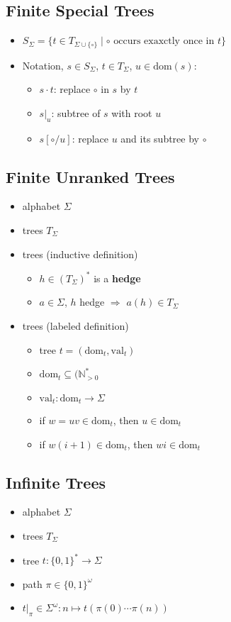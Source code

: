 \documentclass{article}
\begin{document}
\subsection{Finite Special Trees}
\begin{itemize}
	\item $S_\Sigma = \{ t \in T_{\Sigma \cup \{\circ\}} \mid \circ \text{ occurs exaxctly once in } t \}$
	\item Notation, $s \in S_\Sigma$, $t \in T_\Sigma$, $u \in \text{dom}(s)$:
	\begin{itemize}
		\item $s \cdot t$: replace $\circ$ in $s$ by $t$
		\item $s|_u$: subtree of $s$ with root $u$
		\item $s[\circ/u]$: replace $u$ and its subtree by $\circ$
	\end{itemize}
\end{itemize}

\subsection{Finite Unranked Trees}
\begin{itemize}
	\item alphabet $\Sigma$
	\item trees $T_\Sigma$
	\item trees (inductive definition) 
		\begin{itemize}
			\item $h \in (T_\Sigma)^*$ is a \textbf{hedge}
			\item $a \in \Sigma$, $h$ hedge $\Rightarrow$ $a(h) \in T_\Sigma$
		\end{itemize}
	\item trees (labeled definition) 
		\begin{itemize}
			\item tree $t = (\text{dom}_t, \text{val}_t)$
			\item $\text{dom}_t \subseteq (\mathbb{N}_{> 0}^*$
			\item $\text{val}_t : \text{dom}_t \rightarrow \Sigma$
			\item if $w = uv \in \text{dom}_t$, then $u \in \text{dom}_t$
			\item if $w(i+1) \in \text{dom}_t$, then $wi \in \text{dom}_t$
		\end{itemize}
\end{itemize}

\subsection{Infinite Trees}
\begin{itemize}
	\item alphabet $\Sigma$
	\item trees $T_\Sigma$
	\item tree $t : \{0, 1\}^* \rightarrow \Sigma$
	\item path $\pi \in \{0, 1\}^\omega$
	\item $t|_\pi \in \Sigma^\omega : n \mapsto t(\pi(0) \cdots \pi(n))$
\end{itemize}
\end{document}
